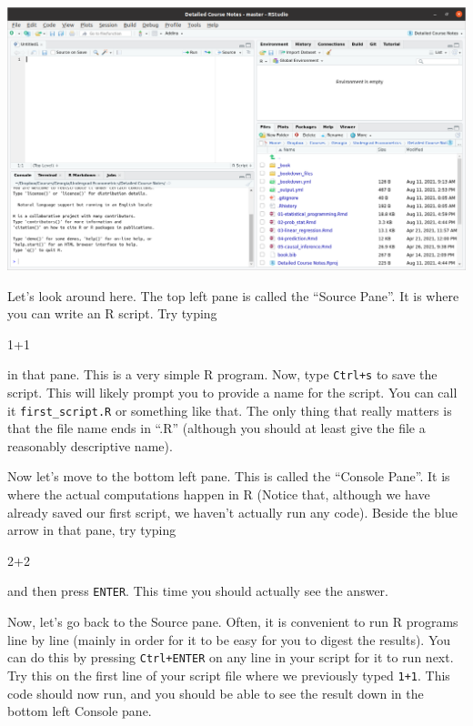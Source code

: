 \documentclass[
  letterpaper,
  DIV=11,
  numbers=noendperiod]{scrreprt}
\newenvironment{Shaded}{\begin{snugshade}}{\end{snugshade}}
\newcommand{\DecValTok}[1]{\textcolor[rgb]{0.68,0.00,0.00}{#1}}
\newcommand{\SpecialCharTok}[1]{\textcolor[rgb]{0.37,0.37,0.37}{#1}}
\begin{document}
\includegraphics{rstudio_script.png}

Let's look around here. The top left pane is called the ``Source Pane''.
It is where you can write an R script. Try typing

\begin{Shaded}
\begin{Highlighting}[]
\DecValTok{1}\SpecialCharTok{+}\DecValTok{1}
\end{Highlighting}
\end{Shaded}

in that pane. This is a very simple R program. Now, type \texttt{Ctrl+s}
to save the script. This will likely prompt you to provide a name for
the script. You can call it \texttt{first\_script.R} or something like
that. The only thing that really matters is that the file name ends in
``.R'' (although you should at least give the file a reasonably
descriptive name).

Now let's move to the bottom left pane. This is called the ``Console
Pane''. It is where the actual computations happen in R (Notice that,
although we have already saved our first script, we haven't actually run
any code). Beside the blue arrow in that pane, try typing

\begin{Shaded}
\begin{Highlighting}[]
\DecValTok{2}\SpecialCharTok{+}\DecValTok{2}
\end{Highlighting}
\end{Shaded}

and then press \texttt{ENTER}. This time you should actually see the
answer.

Now, let's go back to the Source pane. Often, it is convenient to run R
programs line by line (mainly in order for it to be easy for you to
digest the results). You can do this by pressing \texttt{Ctrl+ENTER} on
any line in your script for it to run next. Try this on the first line
of your script file where we previously typed \texttt{1+1}. This code
should now run, and you should be able to see the result down in the
bottom left Console pane.
\end{document}
